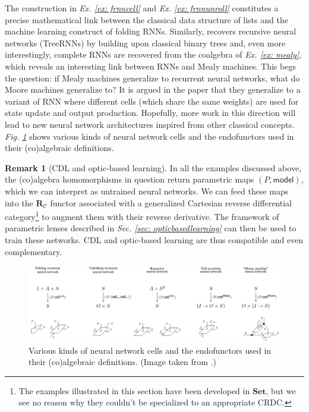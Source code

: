 \documentclass[11pt,a4paper,openright,twoside]{report}
\newcounter{mycounter}
\theoremstyle{plain}
\theoremstyle{definition}
\newtheorem{remark}[mycounter]{Remark}
\begin{document}
The construction in  \textit{Ex. \ref{ex: frnncell}} and \textit{Ex. \ref{ex: frnnunroll}} constitutes a precise mathematical link between the classical data structure of lists and the machine learning construct of folding RNNs. Similarly, \cite{gavranovicposition} recovers recursive neural networks (TreeRNNs) by building upon classical binary trees and, even more interestingly, complete RNNs are recovered from the coalgebra of \textit{Ex. \ref{ex: mealy}}, which reveals an interesting link between RNNs and Mealy machines. This begs the question: if Mealy machines generalize to recurrent neural networks, what do Moore machines generalize to? It is argued in the paper that they generalize to a variant of RNN where different cells (which share the same weights) are used for state update and output production. Hopefully, more work in this direction will lead to new neural network architectures inspired from other classical concepts. \textit{Fig. \ref{fig: cells}} shows various kinds of neural network cells and the endofunctors used in their (co)algebraic definitions.

\begin{remark}[CDL and optic-based learning]
  In all the examples discussed above, the (co)algebra homomorphisms in question return parametric maps $(P,\mathsf{model})$, which we can interpret as untrained neural networks. We can feed these maps into the $\mathbf{R}_{\mathcal{C}}$ functor associated with a generalized Cartesian reverse differential category\footnote{The examples illustrated in this section have been developed in $\mathbf{Set}$, but we see no reason why they couldn't be specialized to an appropriate CRDC.} to augment them with their reverse derivative. The framework of parametric lenses described in 
  \textit{Sec. \ref{sec: opticbasedlearning}} can then be used to train these networks. CDL and optic-based learning are thus compatible and even complementary.
\end{remark}

\begin{figure}[h]
  \begin{center}
    \includegraphics[width=\textwidth]{figures/cells.png}     
    \caption[Neural network cells]{Various kinds of neural network cells and the endofunctors used in their (co)algebraic definitions. (Image taken from \cite{gavranovicposition}.)}
    \label{fig: cells}
  \end{center}
\end{figure}
\end{document}
